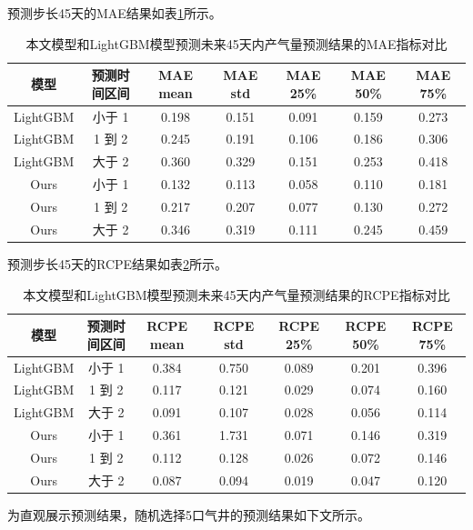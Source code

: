 预测步长45天的MAE结果如表\ref{tab:MAE45}所示。
\begin{table}[H]
    \renewcommand{\arraystretch}{1.5}
    \centering
    \caption{本文模型和LightGBM模型预测未来45天内产气量预测结果的MAE指标对比}
    \label{tab:MAE45}
    \begin{tabular}{|c|c|c|c|c|c|c|}
    \hline
    模型       & 预测时间区间 & MAE mean & MAE std & MAE 25\% & MAE 50\% & MAE 75\% \\ \hline
    LightGBM  & 小于 1      & 0.198    & 0.151   & 0.091    & 0.159    & 0.273    \\ \hline
    LightGBM  & 1 到 2      & 0.245    & 0.191   & 0.106    & 0.186    & 0.306    \\ \hline
    LightGBM  & 大于 2      & 0.360    & 0.329   & 0.151    & 0.253    & 0.418    \\ \hline
    Ours       & 小于 1      & 0.132    & 0.113   & 0.058    & 0.110    & 0.181    \\ \hline
    Ours       & 1 到 2      & 0.217    & 0.207   & 0.077    & 0.130    & 0.272    \\ \hline
    Ours       & 大于 2      & 0.346    & 0.319   & 0.111    & 0.245    & 0.459    \\ \hline
    \end{tabular}
\end{table}
预测步长45天的RCPE结果如表\ref{tab:RCPE45}所示。 
\begin{table}[H]
    \renewcommand{\arraystretch}{1.5}
    \centering
    \caption{本文模型和LightGBM模型预测未来45天内产气量预测结果的RCPE指标对比}
    \label{tab:RCPE45}
    \begin{tabular}{|c|c|c|c|c|c|c|}
    \hline
    模型       & 预测时间区间 & RCPE mean & RCPE std & RCPE 25\% & RCPE 50\% & RCPE 75\% \\ \hline
    LightGBM  & 小于 1      & 0.384     & 0.750    & 0.089     & 0.201     & 0.396     \\ \hline
    LightGBM  & 1 到 2      & 0.117     & 0.121    & 0.029     & 0.074     & 0.160     \\ \hline
    LightGBM  & 大于 2      & 0.091     & 0.107    & 0.028     & 0.056     & 0.114     \\ \hline
    Ours       & 小于 1      & 0.361     & 1.731    & 0.071     & 0.146     & 0.319     \\ \hline
    Ours       & 1 到 2      & 0.112     & 0.128    & 0.026     & 0.072     & 0.146     \\ \hline
    Ours       & 大于 2      & 0.087     & 0.094    & 0.019     & 0.047     & 0.120     \\ \hline
    \end{tabular}
\end{table}
为直观展示预测结果，随机选择5口气井的预测结果如下文所示。
